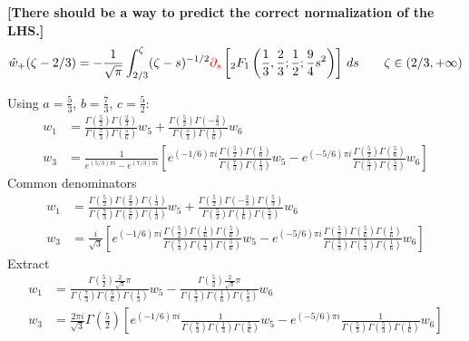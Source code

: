\documentclass[11pt,a4paper,twoside,leqno,noamsfonts]{amsart}
\numberwithin{equation}{section}
\begin{document}
\begin{example}[Airy]
\begin{claim}\label{claim 2}
\textbf{[There should be a way to predict the correct normalization of the LHS.]}
\begin{equation}
\hat{w}_+(\zeta-2/3)=-\frac{1}{\sqrt{\pi}}\int_{2/3}^{\zeta}(\zeta-s)^{-1/2}\textcolor{red}{\partial_s} \left[{}_2F_1\left(\frac{1}{3},\frac{2}{3};\frac{1}{2};\frac{9}{4}s^2\right)\right]\,ds \qquad \zeta\in(2/3,+\infty)
\end{equation}
\end{claim}

\color{Turquoise}
Using $a = \tfrac{5}{3}$, $b = \tfrac{7}{3}$, $c = \tfrac{5}{2}$:
\begin{align*}
w_1 & = \frac{\Gamma(\tfrac{5}{2}) \Gamma(\tfrac{2}{3})}{\Gamma(\tfrac{7}{3}) \Gamma(\tfrac{5}{6})} w_5 + \frac{\Gamma(\tfrac{5}{2}) \Gamma(-\tfrac{2}{3})}{\Gamma(\tfrac{5}{3}) \Gamma(\tfrac{1}{6})} w_6 \\
w_3 & = \frac{1}{e^{(5/3)\pi i} - e^{(7/3)\pi i}} \left[ e^{(-1/6) \pi i} \frac{\Gamma(\tfrac{5}{2}) \Gamma(\tfrac{1}{6})}{\Gamma(\tfrac{7}{3}) \Gamma(\tfrac{1}{3})} w_5 - e^{(-5/6) \pi i} \frac{\Gamma(\tfrac{5}{2}) \Gamma(\tfrac{5}{6})}{\Gamma(\tfrac{5}{3}) \Gamma(\tfrac{5}{3})} w_6 \right]
\end{align*}
Common denominators
\begin{align*}
w_1 & = \frac{\Gamma(\tfrac{5}{2}) \Gamma(\tfrac{2}{3}) \Gamma(\tfrac{1}{3})}{\Gamma(\tfrac{7}{3}) \Gamma(\tfrac{5}{6}) \Gamma(\tfrac{1}{3})} w_5 + \frac{\Gamma(\tfrac{5}{2}) \Gamma(-\tfrac{2}{3}) \Gamma(\tfrac{5}{3})}{\Gamma(\tfrac{5}{3}) \Gamma(\tfrac{1}{6}) \Gamma(\tfrac{5}{3})} w_6 \\
w_3 & = \frac{i}{\sqrt{3}} \left[ e^{(-1/6) \pi i} \frac{\Gamma(\tfrac{5}{2}) \Gamma(\tfrac{1}{6}) \Gamma(\tfrac{5}{6})}{\Gamma(\tfrac{7}{3}) \Gamma(\tfrac{1}{3}) \Gamma(\tfrac{5}{6})} w_5 - e^{(-5/6) \pi i} \frac{\Gamma(\tfrac{5}{2}) \Gamma(\tfrac{5}{6}) \Gamma(\tfrac{1}{6})}{\Gamma(\tfrac{5}{3}) \Gamma(\tfrac{5}{3}) \Gamma(\tfrac{1}{6})} w_6 \right]
\end{align*}
Extract
\begin{align*}
w_1 & = \frac{\Gamma(\tfrac{5}{2}) \tfrac{2}{\sqrt{3}}\pi}{\Gamma(\tfrac{7}{3}) \Gamma(\tfrac{5}{6}) \Gamma(\tfrac{1}{3})} w_5 - \frac{\Gamma(\tfrac{5}{2}) \tfrac{2}{\sqrt{3}}\pi}{\Gamma(\tfrac{5}{3}) \Gamma(\tfrac{1}{6}) \Gamma(\tfrac{5}{3})} w_6 \\
w_3 & = \frac{2\pi i}{\sqrt{3}} \Gamma(\tfrac{5}{2}) \left[ e^{(-1/6) \pi i} \frac{1}{\Gamma(\tfrac{7}{3}) \Gamma(\tfrac{1}{3}) \Gamma(\tfrac{5}{6})} w_5 - e^{(-5/6) \pi i} \frac{1}{\Gamma(\tfrac{5}{3}) \Gamma(\tfrac{5}{3}) \Gamma(\tfrac{1}{6})} w_6 \right]

\end{align*}
\end{example}
\end{document}
